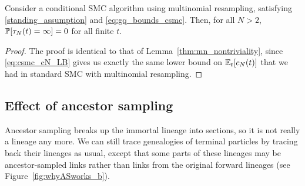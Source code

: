 \begin{lemma}\label{thm:CSMC_nontriviality}
Consider a conditional SMC algorithm using multinomial resampling, satisfying \ref{standing_assumption} and \eqref{eq:gq_bounds_csmc}. 
Then, for all $N>2$, $\mathbb{P}[ \tau_N(t) = \infty ]=0$ for all finite $t$.
\end{lemma}

\begin{proof}
The proof is identical to that of Lemma~\ref{thm:mn_nontriviality}, since \eqref{eq:csmc_cN_LB} gives us exactly the same lower bound on $\mathbb{E}_t [ c_N(t) ]$ that we had in standard SMC with multinomial resampling.
\end{proof}


\subsection{Effect of ancestor sampling}
\label{sec:ancsamp_genealogy}
Ancestor sampling breaks up the immortal lineage into sections, so it is not really a lineage any more.
We can still trace genealogies of terminal particles by tracing back their lineages as usual, except that some parts of these lineages may be ancestor-sampled links rather than links from the original forward lineages (see Figure~\ref{fig:whyASworks_b}).

